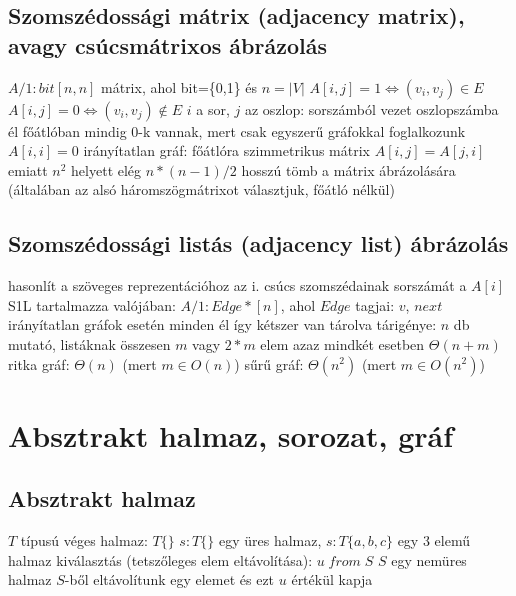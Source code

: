 \documentclass[12pt,a4paper]{article}
\begin{document}
\pagebreak

\subsection{Szomszédossági mátrix (adjacency matrix), avagy csúcsmátrixos ábrázolás}

\begin{outline}
	\1 $A/1 : bit[n,n]$ mátrix, ahol bit=\{0,1\} és $n=|V|$
		\2 $A[i,j] = 1 \Leftrightarrow (v_i,v_j) \in E$
		\2 $A[i,j] = 0 \Leftrightarrow (v_i,v_j) \notin E$
		\2 $i$ a sor, $j$ az oszlop: sorszámból vezet oszlopszámba él
	\1 főátlóban mindig 0-k vannak, mert csak egyszerű gráfokkal foglalkozunk
		\2 $A[i,i] = 0$
	\1 irányítatlan gráf: főátlóra szimmetrikus mátrix
		\2 $A[i,j] = A[j,i]$
		\2 emiatt $n^2$ helyett elég $n*(n-1)/2$ hosszú tömb a mátrix ábrázolására\\
		(általában az alsó háromszögmátrixot választjuk, főátló nélkül)
\end{outline}

\subsection{Szomszédossági listás (adjacency list) ábrázolás}

\begin{outline}
	\1 hasonlít a szöveges reprezentációhoz
	\1 az i. csúcs szomszédainak sorszámát a $A[i]$ S1L tartalmazza
		\2 valójában: $A/1 : Edge*[n]$, ahol $Edge$ tagjai: $v$, $next$
	\1 irányítatlan gráfok esetén minden él így kétszer van tárolva
	\1 tárigénye: $n$ db mutató, listáknak összesen $m$ vagy $2*m$ elem
		\2 azaz mindkét esetben $\Theta(n+m)$
		\2 ritka gráf: $\Theta(n)$ (mert $m \in O(n)$)
		\2 sűrű gráf: $\Theta(n^2)$ (mert $m \in O(n^2)$)
\end{outline}

\pagebreak

\section{Absztrakt halmaz, sorozat, gráf}

\subsection{Absztrakt halmaz}

\begin{outline}
	\1 $T$ típusú véges halmaz: $T\{\}$
	\1 $s : T\{\}$ egy üres halmaz, $s : T\{a,b,c\}$ egy 3 elemű halmaz
	\1 kiválasztás (tetszőleges elem eltávolítása): $u \;from\; S$
		\2 $S$ egy nemüres halmaz
		\2 $S$-ből eltávolítunk egy elemet és ezt $u$ értékül kapja
\end{outline}
\end{document}
